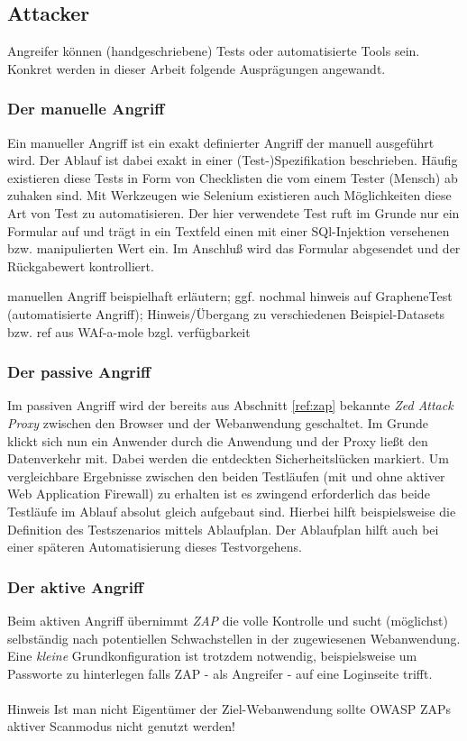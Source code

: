 \subsection{Attacker}
Angreifer können (handgeschriebene) Tests oder automatisierte Tools sein. Konkret werden in dieser Arbeit folgende Ausprägungen angewandt.

\subsubsection{Der manuelle Angriff}

Ein manueller Angriff ist ein exakt definierter Angriff der manuell ausgeführt wird. Der Ablauf ist dabei exakt in einer (Test-)Spezifikation beschrieben. Häufig existieren diese Tests in Form von Checklisten die vom einem Tester (Mensch) ab zuhaken sind. Mit Werkzeugen wie Selenium existieren auch Möglichkeiten diese Art von Test zu automatisieren. Der hier verwendete Test ruft im Grunde nur ein Formular auf und trägt in ein Textfeld einen mit einer SQl-Injektion versehenen bzw. manipulierten Wert ein. Im Anschluß wird das Formular abgesendet und der Rückgabewert kontrolliert.

\begin{neu}
manuellen Angriff beispielhaft erläutern; ggf. nochmal hinweis auf GrapheneTest (automatisierte Angriff); Hinweis/Übergang zu verschiedenen Beispiel-Datasets bzw. ref aus WAf-a-mole bzgl. verfügbarkeit
\end{neu}


\subsubsection{Der passive Angriff}
Im passiven Angriff wird der bereits aus Abschnitt \ref{ref:zap} bekannte \emph{Zed Attack Proxy} zwischen den Browser und der Webanwendung geschaltet. Im Grunde klickt sich nun ein Anwender durch die Anwendung und der Proxy ließt den Datenverkehr mit. Dabei werden die entdeckten Sicherheitslücken markiert. Um vergleichbare Ergebnisse zwischen den beiden Testläufen (mit und ohne aktiver Web Application Firewall) zu erhalten ist es zwingend erforderlich das beide Testläufe im Ablauf absolut gleich aufgebaut sind. Hierbei hilft beispielsweise die Definition des Testszenarios mittels Ablaufplan. Der Ablaufplan hilft auch bei einer späteren Automatisierung dieses Testvorgehens.

\subsubsection{Der aktive Angriff}
Beim aktiven Angriff übernimmt \emph{ZAP} die volle Kontrolle und sucht (möglichst) selbständig nach potentiellen Schwachstellen in der zugewiesenen Webanwendung. Eine \emph{kleine} Grundkonfiguration ist trotzdem notwendig, beispielsweise um Passworte zu hinterlegen falls ZAP - als Angreifer - auf eine Loginseite trifft. \\\\
\textcolor{bhtGray}{ Hinweis} Ist man nicht Eigentümer der Ziel-Webanwendung sollte OWASP ZAPs aktiver Scanmodus nicht genutzt werden!\\


